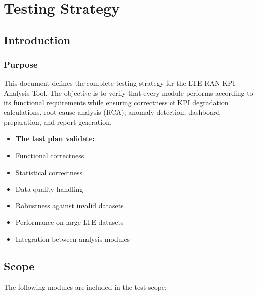 \chapter{Testing Strategy}

\section{Introduction}
\subsection{Purpose}
This document defines the complete testing strategy for the LTE RAN KPI Analysis Tool. The objective is to verify that every module performs according to its functional requirements while ensuring correctness of KPI degradation calculations, root cause analysis (RCA), anomaly detection, dashboard preparation, and report generation.


\begin{itemize}[leftmargin=*]
    \item \textbf{The test plan validate:}
    \item Functional correctness
    \item Statistical correctness
    \item Data quality handling
    \item Robustness against invalid datasets
    \item Performance on large LTE datasets
    \item Integration between analysis modules
\end{itemize}

\section{Scope}
The following modules are included in the test scope:

